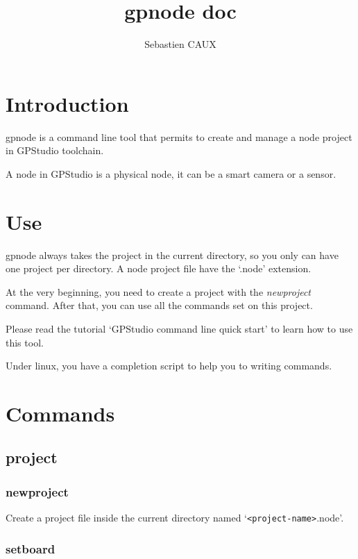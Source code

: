 \documentclass[10pt,a4paper]{article}
\author{Sebastien CAUX}
\title{gpnode doc \version}
\begin{document}
\maketitle
\section{Introduction}
gpnode is a command line tool that permits to create and manage a node project in GPStudio toolchain.

A node in GPStudio is a physical node, it can be a smart camera or a sensor.

\section{Use}
gpnode always takes the project in the current directory, so you only can have one project per directory. A node project file have the `.node' extension.

At the very beginning, you need to create a project with the \emph{newproject} command. After that, you can use all the commands set on this project.

Please read the tutorial `GPStudio command line quick start' to learn how to use this tool.

Under linux, you have a completion script to help you to writing commands.

\section{Commands}
\subsection{project}
\subsubsection{newproject}

Create a project file inside the current directory named `\texttt{<project-name>}.node'.


\subsubsection{setboard}
\end{document}
